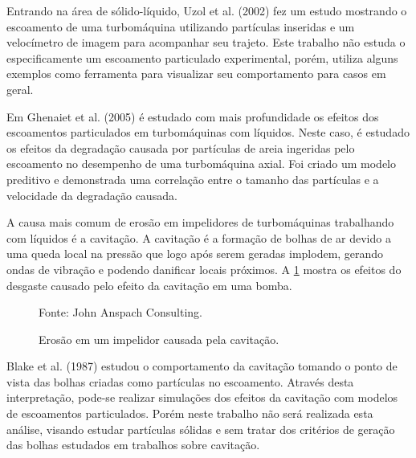 Entrando na área de sólido-líquido, Uzol et al. (2002)\cite{Uzol-2002} fez um estudo mostrando o escoamento de uma turbomáquina utilizando partículas inseridas e um velocímetro de imagem para acompanhar seu trajeto.
Este trabalho não estuda o especificamente um escoamento particulado experimental, porém, utiliza alguns exemplos como ferramenta para visualizar seu comportamento para casos em geral.

Em Ghenaiet et al. (2005)\cite{Ghenaiet-2005} é estudado com mais profundidade os efeitos dos escoamentos particulados em turbomáquinas com líquidos.
Neste caso, é estudado os efeitos da degradação causada por partículas de areia ingeridas pelo escoamento no desempenho de uma turbomáquina axial.
Foi criado um modelo preditivo e demonstrada uma correlação entre o tamanho das partículas e a velocidade da degradação causada.

A causa mais comum de erosão em impelidores de turbomáquinas trabalhando com líquidos é a cavitação.
A cavitação é a formação de bolhas de ar devido a uma queda local na pressão que logo após serem geradas implodem, gerando ondas de vibração e podendo danificar locais próximos.
A \ref{JAC-Pump} mostra os efeitos do desgaste causado pelo efeito da cavitação em uma bomba.
\begin{figure}[H]
    \centering
     {\raggedleft \scriptsize Fonte: John Anspach Consulting\cite{JAC}.}
    \caption{Erosão em um impelidor causada pela cavitação.}
    \label{JAC-Pump}
\end{figure}

Blake et al. (1987)\cite{Blake-1987} estudou o comportamento da cavitação tomando o ponto de vista das bolhas criadas como partículas no escoamento.
Através desta interpretação, pode-se realizar simulações dos efeitos da cavitação com modelos de escoamentos particulados.
Porém neste trabalho não será realizada esta análise, visando estudar partículas sólidas e sem tratar dos critérios de geração das bolhas estudados em trabalhos sobre cavitação.

